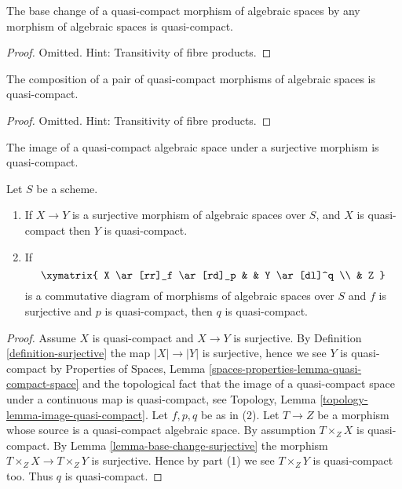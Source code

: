 \begin{lemma}
\label{lemma-base-change-quasi-compact}
The base change of a quasi-compact morphism of algebraic spaces
by any morphism of algebraic spaces is quasi-compact.
\end{lemma}

\begin{proof}
Omitted. Hint: Transitivity of fibre products.
\end{proof}

\begin{lemma}
\label{lemma-composition-quasi-compact}
The composition of a pair of quasi-compact morphisms of algebraic spaces
is quasi-compact.
\end{lemma}

\begin{proof}
Omitted. Hint: Transitivity of fibre products.
\end{proof}

\begin{lemma}
\label{lemma-surjection-from-quasi-compact}
\begin{slogan}
The image of a quasi-compact algebraic space under a surjective morphism
is quasi-compact.
\end{slogan}
Let $S$ be a scheme.
\begin{enumerate}
\item If $X \to Y$ is a surjective morphism of algebraic spaces over $S$,
and $X$ is quasi-compact then $Y$ is quasi-compact.
\item If
$$
\xymatrix{
X \ar[rr]_f \ar[rd]_p & &
Y \ar[dl]^q \\
& Z
}
$$
is a commutative diagram of morphisms of algebraic spaces over $S$
and $f$ is surjective and $p$ is quasi-compact, then $q$ is quasi-compact.
\end{enumerate}
\end{lemma}

\begin{proof}
Assume $X$ is quasi-compact and $X \to Y$ is surjective. By
Definition \ref{definition-surjective}
the map $|X| \to |Y|$ is surjective, hence we see $Y$ is quasi-compact by
Properties of Spaces, Lemma \ref{spaces-properties-lemma-quasi-compact-space}
and the topological fact that the image of a quasi-compact space under a
continuous map is quasi-compact, see
Topology, Lemma \ref{topology-lemma-image-quasi-compact}.
Let $f, p, q$ be as in (2).
Let $T \to Z$ be a morphism whose source is a quasi-compact algebraic space.
By assumption $T \times_Z X$ is quasi-compact. By
Lemma \ref{lemma-base-change-surjective}
the morphism $T \times_Z X \to T \times_Z Y$ is surjective.
Hence by part (1) we see $T \times_Z Y$ is quasi-compact too.
Thus $q$ is quasi-compact.
\end{proof}

